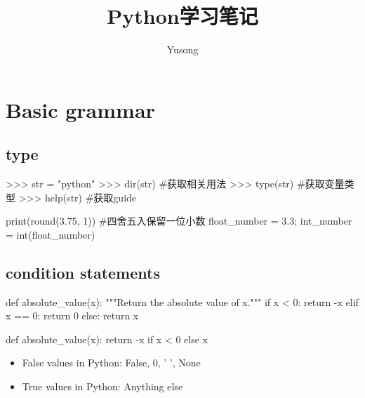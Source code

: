 \documentclass{article}
\title{\huge Python学习笔记}
\author{\large Yusong}
\date{}
\begin{document}

  \maketitle
  \thispagestyle{empty}

  \newpage
  \hypertarget{contents}{}
  \setcounter{page}{1}
  \tableofcontents

  \newpage
  \setcounter{page}{1}

  \section{Basic grammar}

    \subsection{type}
      \begin{codeblock}[language=python, caption={variable type}]
        >>> str = "python"
        >>> dir(str) #获取相关用法
        >>> type(str) #获取变量类型
        >>> help(str) #获取guide
      \end{codeblock}

      \begin{codeblock}[language=python, caption={basic functions}]
        print(round(3.75, 1)) #四舍五入保留一位小数
        float_number = 3.3; int_number = int(float_number)
      \end{codeblock}

    \subsection{condition statements}
      \begin{codeblock}[language=python, caption={condition statement}]
        def absolute_value(x):
          """Return the absolute value of x."""
          if x < 0:
            return -x
          elif x == 0:
            return 0
          else:
            return x

        def absolute_value(x):
          return -x if x < 0 else x
      \end{codeblock}

      \begin{itemize}
        \item False values in Python: False, 0, ' ', None
        \item True values in Python: Anything else
      \end{itemize}
\end{document}
